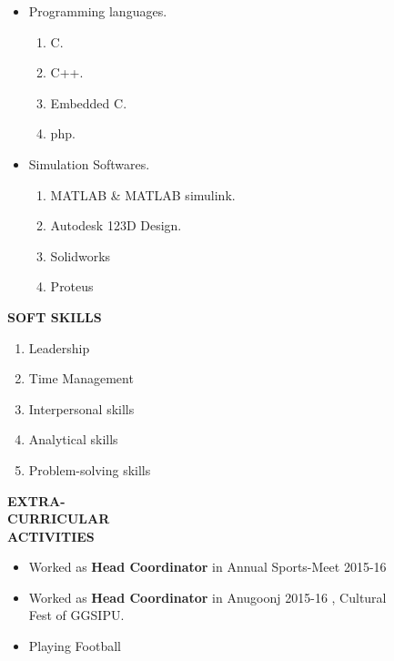 \documentclass[11pt]{article}
\begin{document}
\begin{itemize}
\vspace{-0.72in}	                                     		\addtolength{\itemindent}{1.3in}	                                     \item Programming languages.
{\begin{enumerate}
\addtolength{\itemindent}{1.359in}                             		\item C.
\item C++.
\item Embedded C.
\item php.
\end{enumerate}
}
\item  Simulation Softwares.
{\begin{enumerate}
\addtolength{\itemindent}{1.359in}                             		\item MATLAB \& MATLAB simulink.
\item Autodesk 123D Design.
\item Solidworks 
\item Proteus
\end{enumerate}
}
\end{itemize}

\begin{flushleft}
{\Large \textbf{SOFT SKILLS}}
\begin{flushright} 
\begin{enumerate}
\addtolength{\itemindent}{1.55in} 
\vspace{-0.32in} 
\item Leadership
\item Time Management	
\item Interpersonal skills
\item Analytical skills 
\item Problem-solving skills
\end{enumerate} 
\end{flushright}
\end{flushleft}	

\begin{flushleft}

{\large \bf{EXTRA-\\ CURRICULAR\\ ACTIVITIES}}
\begin{itemize}
\addtolength{\itemindent}{1.5in}
\vspace{-0.70in} 
\item Worked as {\bf Head Coordinator} in Annual Sports-Meet 2015-16 
\item Worked as {\bf Head Coordinator} in Anugoonj 2015-16 , Cultural\\ \hspace{1.47in} Fest of GGSIPU.
\item Playing Football
\end{itemize}
\end{flushleft}                                    		
\end{document}
